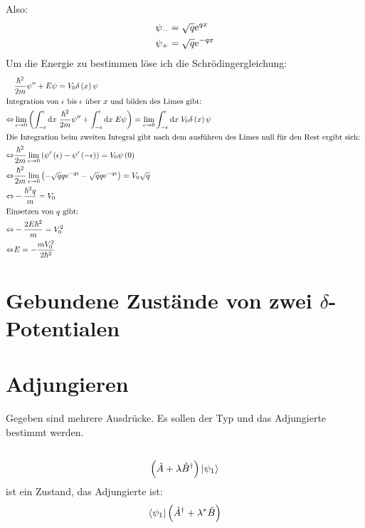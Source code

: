 \documentclass[11pt, ngerman, fleqn, DIV=15, headinclude]{scrartcl}
\begin{document}
Also:
\begin{align*}
	\psi_-	&= \sqrt{q}\mathrm e^{qx}\\
	\psi_+	&= \sqrt{q}\mathrm e^{-qx}
\end{align*}
Um die Energie zu bestimmen löse ich die Schrödingergleichung:
\begin{align*}
	&\frac{\hbar^2}{2m}\psi'' + E\psi = V_0\delta\del{x}\psi\\
	\intertext{%
		Integration von $\-\epsilon$ bis $\epsilon$ über $x$ und bilden des Limes gibt:
	}
	\Leftrightarrow&\lim_{\epsilon\to0}\del{\int_{-\epsilon}^{\epsilon}\dif x\;\frac{\hbar^2}{2m}\psi'' + \int_{-\epsilon}^{\epsilon}\dif x\;E\psi} = \lim_{\epsilon\to0}\int_{-\epsilon}^{\epsilon}\dif x\;V_0\delta\del{x}\psi\\
	\intertext{%
		Die Integration beim zweiten Integral gibt nach dem ausführen des Limes null für den Rest ergibt sich:
	}
	\Leftrightarrow&\frac{\hbar^2}{2m}\lim_{\epsilon\to0}\del{\psi'\del{\epsilon}-\psi'\del{-\epsilon}}=V_0\psi\del{0}\\
	\Leftrightarrow&\frac{\hbar^2}{2m}\lim_{\epsilon\to0}\del{-\sqrt{q}q\eup^{-q\epsilon}-\sqrt{q}q\eup^{-q\epsilon}}=V_0\sqrt{q}\\
	\Leftrightarrow&-\frac{\hbar^2q}{m}=V_0\\
	\intertext{%
		Einsetzen von $q$ gibt:
	}
	\Leftrightarrow&-\frac{2E\hbar^2}{m}=V_0^2\\
	\Leftrightarrow&E=-\frac{mV_0^2}{2\hbar^2}\\
\end{align*}

\section{Gebundene Zustände von zwei $\delta$-Potentialen}

\section{Adjungieren}

Gegeben sind mehrere Ausdrücke. Es sollen der Typ und das Adjungierte bestimmt werden.

\subsection{}
\begin{align*}
	\left( \hat{A}+\lambda\hat{B}^{\dagger} \right)\ket{\psi_1}
\end{align*}
ist ein Zustand, das Adjungierte ist:
\begin{align*}
	\bra{\psi_1}\left( \hat{A}^{\dagger}+\lambda^*\hat{B} \right)
\end{align*}
\end{document}
